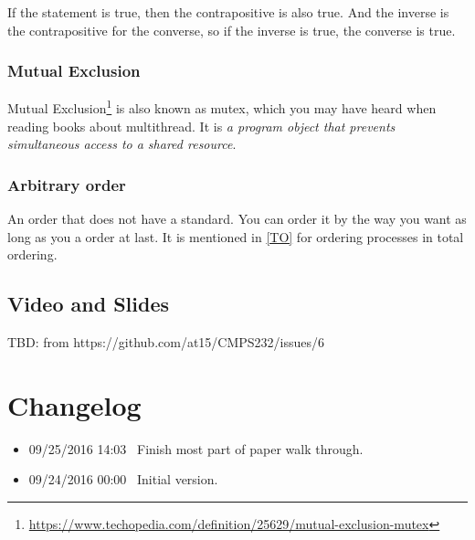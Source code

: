 \documentclass[12pt,a4paper,oneside]{article}
\begin{document}
If the statement is true, then the contrapositive is also true.
And the inverse is the contrapositive for the converse, so if the inverse is true, the converse is true.

\subsubsection{Mutual Exclusion}

Mutual Exclusion\footnote{\url{https://www.techopedia.com/definition/25629/mutual-exclusion-mutex}} is also known as mutex,
which you may have heard when reading books about multithread.
It is \textit{a program object that prevents simultaneous access to a shared resource}.

\subsubsection{Arbitrary order} \label{term:arbitrary_order}

An order that does not have a standard. You can order it by the way you want as long as you a order at last.
It is mentioned in \ref{TO} for ordering processes in total ordering.

\subsection{Video and Slides}

TBD: from https://github.com/at15/CMPS232/issues/6

\section{Changelog}

\begin{itemize}
  \item 09/25/2016 14:03 \ Finish most part of paper walk through.
  \item 09/24/2016 00:00 \ Initial version.
\end{itemize}

\printbibliography
\end{document}
